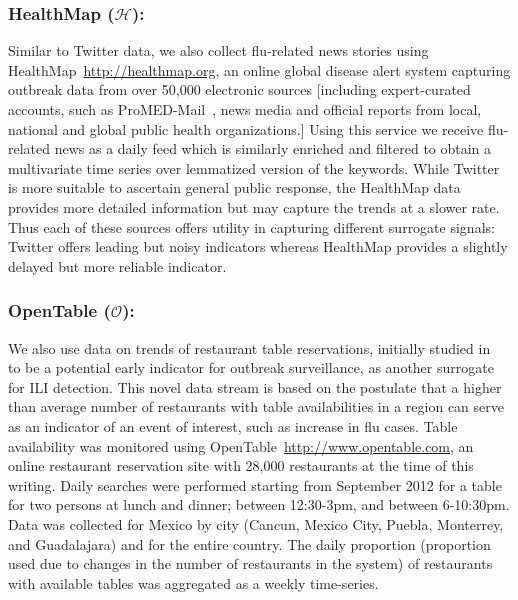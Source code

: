 \subsubsection{HealthMap ($\mathcal{H}$):} 
Similar to Twitter data, we also collect flu-related
news stories using HealthMap~\url{http://healthmap.org}, an online global disease alert
system capturing outbreak data from over 50,000 electronic sources [including
expert-curated accounts, such as ProMED-Mail~\cite{chase1996promed}, news media
and official reports from local, national and global public health
organizations.] Using this service we receive flu-related news as a daily feed
which is similarly enriched and filtered to obtain
a multivariate time series over lemmatized version of the keywords. 
While Twitter is more suitable to ascertain general public response, the
HealthMap data provides more detailed information but may capture the trends
at a slower rate. Thus each of these sources offers utility in
capturing different surrogate signals: Twitter offers leading but noisy
indicators whereas HealthMap provides a slightly delayed but more reliable
indicator.

\subsubsection{OpenTable ($\mathcal{O}$):}
We also use data on trends of restaurant table reservations, initially 
studied in~\cite{elaine2013opentable} to be a potential early indicator for
outbreak surveillance, as another surrogate for ILI detection.
This novel data stream is based on the
postulate that a higher than average number of restaurants with table
availabilities in a region can serve as an indicator of an event of interest,
such as increase in flu cases. Table availability was monitored using 
OpenTable~\url{http://www.opentable.com}, 
an online restaurant reservation site with 28,000 restaurants at the time
of this writing. Daily searches were performed starting from September 2012 for
a table for two persons at lunch and dinner; between 12:30-3pm, and between
6-10:30pm. Data was collected for Mexico by city (Cancun, Mexico City, Puebla,
Monterrey, and Guadalajara) and for the entire country. The daily proportion
(proportion used due to changes in the number of restaurants in the system) of
restaurants with available tables was aggregated as a weekly time-series.


